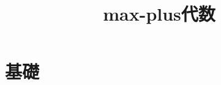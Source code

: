 \documentclass{classes/report}
\begin{document}
\title{max-plus代数}
\maketitle
\tableofcontents

\chapter{基礎}
\end{document}
